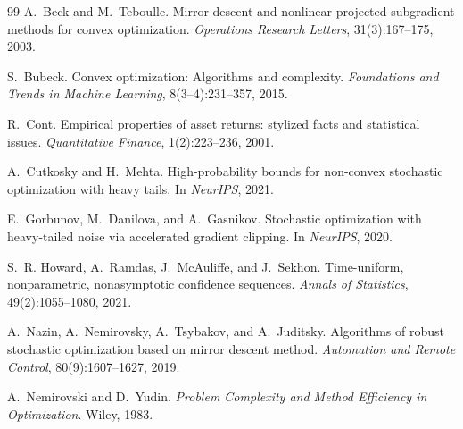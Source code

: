\begin{thebibliography}{99}
 A.~Beck and M.~Teboulle.  Mirror descent and nonlinear projected subgradient methods for convex optimization.  \emph{Operations Research Letters}, 31(3):167--175, 2003.

 S.~Bubeck.  Convex optimization: Algorithms and complexity.  \emph{Foundations and Trends in Machine Learning}, 8(3--4):231--357, 2015.

 R.~Cont.  Empirical properties of asset returns: stylized facts and statistical issues.  \emph{Quantitative Finance}, 1(2):223--236, 2001.

 A.~Cutkosky and H.~Mehta.  High-probability bounds for non-convex stochastic optimization with heavy tails.  In \emph{NeurIPS}, 2021.

 E.~Gorbunov, M.~Danilova, and A.~Gasnikov.  Stochastic optimization with heavy-tailed noise via accelerated gradient clipping.  In \emph{NeurIPS}, 2020.

 S.~R. Howard, A.~Ramdas, J.~McAuliffe, and J.~Sekhon.  Time-uniform, nonparametric, nonasymptotic confidence sequences.  \emph{Annals of Statistics}, 49(2):1055--1080, 2021.

 A.~Nazin, A.~Nemirovsky, A.~Tsybakov, and A.~Juditsky.  Algorithms of robust stochastic optimization based on mirror descent method.  \emph{Automation and Remote Control}, 80(9):1607--1627, 2019.

 A.~Nemirovski and D.~Yudin.  \emph{Problem Complexity and Method Efficiency in Optimization}.  Wiley, 1983.
\end{thebibliography}


